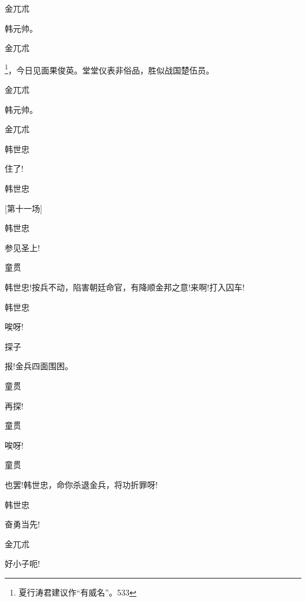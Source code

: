 {{{{金兀朮\hspace{20pt}~

韩元帅。}

{金兀朮

\footnote{ 夏行涛君建议作``有威名''。{533}}{，今日见面果俊英。堂堂仪表非俗品，胜似战国楚伍员。} }

{金兀朮\hspace{20pt}~

韩元帅。}

{金兀朮\hspace{20pt}~

 }

{韩世忠\hspace{20pt}~

住了!}

{韩世忠

 }

{{[}第十一场{]}}

{韩世忠\hspace{20pt}~

参见圣上!}

{童贯

韩世忠!按兵不动，陷害朝廷命官，有降顺金邦之意!来啊!打入囚车!}

{韩世忠\hspace{20pt}~

唉呀!}

{探子\hspace{30pt}~

报!金兵四面围困。}

{童贯\hspace{30pt}~

再探!}

{童贯\hspace{30pt}~

唉呀!}

{童贯\hspace{30pt}~

也罢!韩世忠，命你杀退金兵，将功折罪呀!}

{韩世忠\hspace{20pt}~

奋勇当先!}

{金兀朮\hspace{20pt}~

好小子呃!}

}}}
